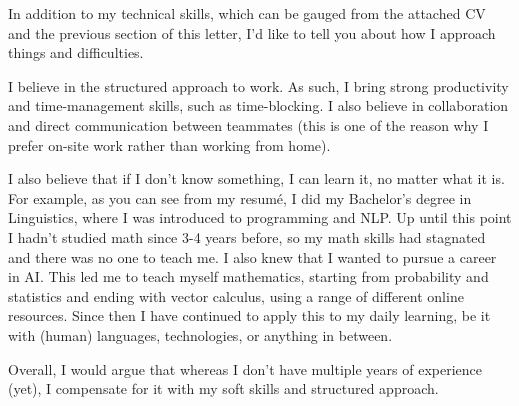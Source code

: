 \documentclass[11pt, a4paper]{awesome-cv}
\begin{document}
\begin{cvletter}
In addition to my technical skills, which can be gauged from the attached CV and the previous section of this letter, I'd like to tell you about how I approach things and difficulties.

I believe in the structured approach to work. As such, I bring strong productivity and time-management skills, such as time-blocking. I also believe in collaboration and direct communication between teammates (this is one of the reason why I prefer on-site work rather than working from home).

I also believe that if I don't know something, I can learn it, no matter what it is. For example, as you can see from my resumé, I did my Bachelor's degree in Linguistics, where I was introduced to programming and NLP. Up until this point I hadn't studied math since 3-4 years before, so my math skills had stagnated and there was no one to teach me. I also knew that I wanted to pursue a career in AI. This led me to teach myself mathematics, starting from probability and statistics and ending with vector calculus, using a range of different online resources. Since then I have continued to apply this to my daily learning, be it with (human) languages, technologies, or anything in between.

Overall, I would argue that whereas I don't have multiple years of experience (yet), I compensate for it with my soft skills and structured approach.

\end{cvletter}


\makeletterclosing
\end{document}

